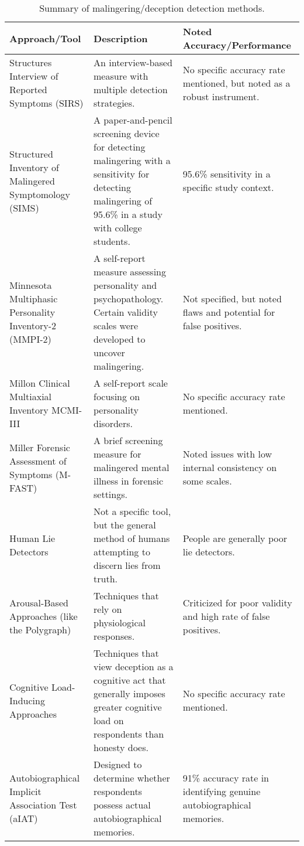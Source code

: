  {\RaggedRight
\def\arraystretch{1}\tabcolsep=10pt
\begin{longtable}{L{1.5in} L{2.5in} L{2in}}
\caption{Summary of malingering/deception detection methods.}
\label{tbl:methods_summary}\\
\toprule
\textbf{Approach/Tool} & \textbf{Description} & \textbf{Noted Accuracy/Performance} \\ \midrule
Structures Interview of Reported Symptoms (SIRS)\cite{Wong2005} & An interview-based measure with multiple detection strategies. & No specific accuracy rate mentioned, but noted as a robust instrument. \\ \midrule
Structured Inventory of Malingered Symptomology (SIMS)\cite{smith1997detection} & A paper-and-pencil screening device for detecting malingering with a sensitivity for detecting malingering of 95.6\% in a study with college students. & 95.6\% sensitivity in a specific study context. \\ \midrule
Minnesota Multiphasic Personality Inventory-2 (MMPI-2)\cite{ben2012interpreting} & A self-report measure assessing personality and psychopathology. Certain validity scales were developed to uncover malingering. & Not specified, but noted flaws and potential for false positives. \\ \midrule
Millon Clinical Multiaxial Inventory MCMI-III & A self-report scale focusing on personality disorders. & No specific accuracy rate mentioned. \\ \midrule
Miller Forensic Assessment of Symptoms (M-FAST) & A brief screening measure for malingered mental illness in forensic settings. & Noted issues with low internal consistency on some scales. \\ \midrule
Human Lie Detectors & Not a specific tool, but the general method of humans attempting to discern lies from truth. & People are generally poor lie detectors. \\ \midrule
Arousal-Based Approaches (like the Polygraph) & Techniques that rely on physiological responses. & Criticized for poor validity and high rate of false positives. \\ \midrule
Cognitive Load-Inducing Approaches & Techniques that view deception as a cognitive act that generally imposes greater cognitive load on respondents than honesty does. & No specific accuracy rate mentioned. \\ \midrule
Autobiographical Implicit Association Test (aIAT)\cite{sartori2008accurately} & Designed to determine whether respondents possess actual autobiographical memories. & 91\% accuracy rate in identifying genuine autobiographical memories. \\ \midrule

\end{longtable}}
